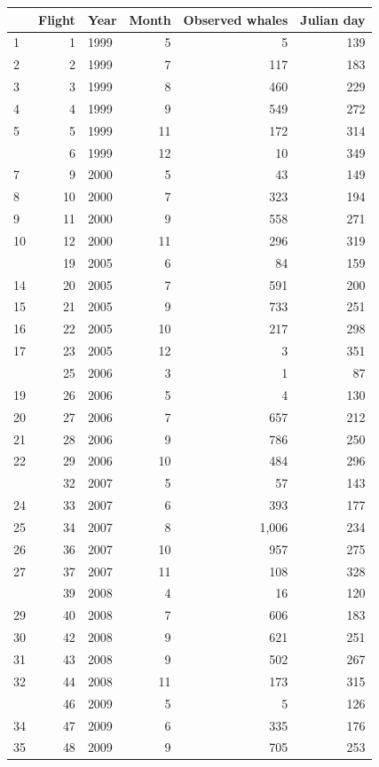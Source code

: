 \documentclass[
]{article}
\begin{document}
\begin{longtable}[t]{lrlrrr}
\toprule
 & Flight & Year & Month & Observed whales & Julian day\\
\midrule
1 & 1 & 1999 & 5 & 5 & 139\\
2 & 2 & 1999 & 7 & 117 & 183\\
3 & 3 & 1999 & 8 & 460 & 229\\
4 & 4 & 1999 & 9 & 549 & 272\\
5 & 5 & 1999 & 11 & 172 & 314\\
\addlinespace
6 & 6 & 1999 & 12 & 10 & 349\\
7 & 9 & 2000 & 5 & 43 & 149\\
8 & 10 & 2000 & 7 & 323 & 194\\
9 & 11 & 2000 & 9 & 558 & 271\\
10 & 12 & 2000 & 11 & 296 & 319\\
\addlinespace
13 & 19 & 2005 & 6 & 84 & 159\\
14 & 20 & 2005 & 7 & 591 & 200\\
15 & 21 & 2005 & 9 & 733 & 251\\
16 & 22 & 2005 & 10 & 217 & 298\\
17 & 23 & 2005 & 12 & 3 & 351\\
\addlinespace
18 & 25 & 2006 & 3 & 1 & 87\\
19 & 26 & 2006 & 5 & 4 & 130\\
20 & 27 & 2006 & 7 & 657 & 212\\
21 & 28 & 2006 & 9 & 786 & 250\\
22 & 29 & 2006 & 10 & 484 & 296\\
\addlinespace
23 & 32 & 2007 & 5 & 57 & 143\\
24 & 33 & 2007 & 6 & 393 & 177\\
25 & 34 & 2007 & 8 & 1,006 & 234\\
26 & 36 & 2007 & 10 & 957 & 275\\
27 & 37 & 2007 & 11 & 108 & 328\\
\addlinespace
28 & 39 & 2008 & 4 & 16 & 120\\
29 & 40 & 2008 & 7 & 606 & 183\\
30 & 42 & 2008 & 9 & 621 & 251\\
31 & 43 & 2008 & 9 & 502 & 267\\
32 & 44 & 2008 & 11 & 173 & 315\\
\addlinespace
33 & 46 & 2009 & 5 & 5 & 126\\
34 & 47 & 2009 & 6 & 335 & 176\\
35 & 48 & 2009 & 9 & 705 & 253\\

\end{longtable}
\end{document}
